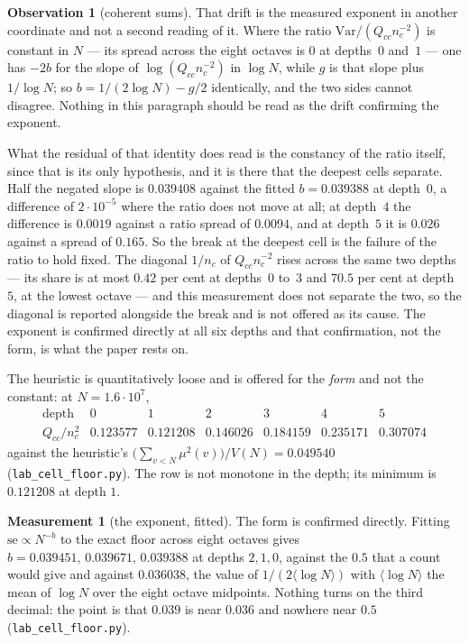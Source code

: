 \documentclass[11pt,a4paper]{article}
\theoremstyle{plain}
\theoremstyle{definition}
\newtheorem{observation}[theorem]{Observation}
\newtheorem{measurement}[theorem]{Measurement}
\theoremstyle{remark}
\begin{document}
\begin{observation}[coherent sums]
That drift is the measured exponent in another coordinate and not a
second reading of it. Where the ratio $\mathrm{Var}/(Q_{cc}n_c^{-2})$
is constant in $N$ --- its spread across the eight octaves is $0$ at
depths~$0$ and~$1$ --- one has $-2b$ for the slope of
$\log(Q_{cc}n_c^{-2})$ in $\log N$, while $g$ is that slope plus
$1/\log N$; so $b=1/(2\log N)-g/2$ identically, and the two sides
cannot disagree.
Nothing in this paragraph should be read as the drift confirming the
exponent.

What the residual of that identity does read is the constancy of the
ratio itself, since that is its only hypothesis, and it is there that
the deepest cells separate. Half the negated slope is $0.039408$
against the fitted $b=0.039388$ at depth~$0$, a difference of
$2\cdot10^{-5}$ where the ratio does not move at all; at depth~$4$ the
difference is $0.0019$ against a ratio spread of $0.0094$, and at
depth~$5$ it is $0.026$ against a spread of $0.165$. So the break at
the deepest cell is the failure of the ratio to hold fixed. The
diagonal $1/n_c$ of $Q_{cc}n_c^{-2}$ rises across the same two
depths --- its share is at most $0.42$ per cent at depths~$0$ to~$3$
and $70.5$ per cent at depth~$5$, at the lowest octave --- and this
measurement does not separate the two, so the diagonal is reported
alongside the break and is not offered as its cause. The exponent is confirmed directly at all six depths and
that confirmation, not the form, is what the paper rests on.
\end{observation}

The heuristic is quantitatively loose and is offered for the
\emph{form} and not the constant: at $N=1.6\cdot10^7$,
\[
\begin{array}{r|cccccc}
 \text{depth} & 0 & 1 & 2 & 3 & 4 & 5\\\hline
 Q_{cc}/n_c^2 & 0.123577 & 0.121208 & 0.146026 & 0.184159 & 0.235171
   & 0.307074
\end{array}
\]
against the heuristic's
$\bigl(\sum_{v<N}\mu^2(v)\bigr)/V(N)=0.049540$
(\texttt{lab\_cell\_floor.py}). The row is not monotone in the depth;
its minimum is $0.121208$ at depth $1$.

\begin{measurement}[the exponent, fitted]\label{meas:exponent}
The form is confirmed directly. Fitting $\mathrm{se}\propto N^{-b}$ to
the exact floor across eight octaves gives
$b=0.039451,\,0.039671,\,0.039388$ at depths $2,1,0$, against the
$0.5$ that a count would give and against $0.036038$, the value of
$1/(2\langle\log N\rangle)$ with $\langle\log N\rangle$ the mean of
$\log N$ over the eight octave midpoints. Nothing turns on the third
decimal: the point is that $0.039$ is near $0.036$ and nowhere near
$0.5$ (\texttt{lab\_cell\_floor.py}).
\end{measurement}
\end{document}

